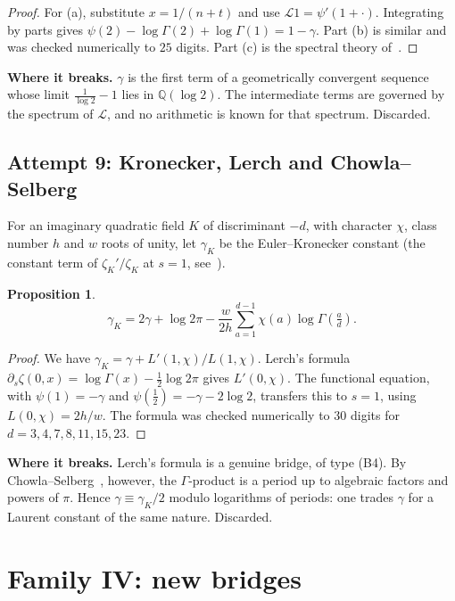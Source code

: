 \documentclass[11pt,a4paper]{article}
\newtheorem{proposition}[theorem]{Proposition}
\theoremstyle{definition}
\theoremstyle{remark}
\newcommand{\Q}{\mathbb Q}
\numberwithin{equation}{section}
\begin{document}
\begin{proof}
For (a), substitute $x=1/(n+t)$ and use $\mathcal L1=\psi'(1+\cdot)$. Integrating by parts gives $\psi(2)-\log\Gamma(2)+\log\Gamma(1)=1-\gamma$. Part (b) is similar and was checked numerically to $25$ digits. Part (c) is the spectral theory of~\cite{p4:Wir}.
\end{proof}

\noindent\textbf{Where it breaks.} $\gamma$ is the first term of a geometrically convergent sequence whose limit $\frac1{\log2}-1$ lies in $\Q(\log2)$. The intermediate terms are governed by the spectrum of $\mathcal L$, and no arithmetic is known for that spectrum. Discarded.

\subsection{Attempt 9: Kronecker, Lerch and Chowla--Selberg}

For an imaginary quadratic field $K$ of discriminant $-d$, with character $\chi$, class number $h$ and $w$ roots of unity, let $\gamma_K$ be the Euler--Kronecker constant (the constant term of $\zeta_K'/\zeta_K$ at $s=1$, see~\cite{p4:Iha}).

\begin{proposition}\label{p4:prop:EK}
\[
\gamma_K=2\gamma+\log2\pi-\frac w{2h}\sum_{a=1}^{d-1}\chi(a)\log\Gamma\!\left(\tfrac ad\right).
\]
\end{proposition}

\begin{proof}
We have $\gamma_K=\gamma+L'(1,\chi)/L(1,\chi)$. Lerch's formula $\partial_s\zeta(0,x)=\log\Gamma(x)-\frac12\log2\pi$ gives $L'(0,\chi)$. The functional equation, with $\psi(1)=-\gamma$ and $\psi(\frac12)=-\gamma-2\log2$, transfers this to $s=1$, using $L(0,\chi)=2h/w$. The formula was checked numerically to $30$ digits for $d=3,4,7,8,11,15,23$.
\end{proof}

\noindent\textbf{Where it breaks.} Lerch's formula is a genuine bridge, of type (B4). By Chowla--Selberg~\cite{p4:CS}, however, the $\Gamma$-product is a period up to algebraic factors and powers of $\pi$. Hence $\gamma\equiv\gamma_K/2$ modulo logarithms of periods: one trades $\gamma$ for a Laurent constant of the same nature. Discarded.

\section{Family IV: new bridges}\label{p4:sec:bridges}
\end{document}
